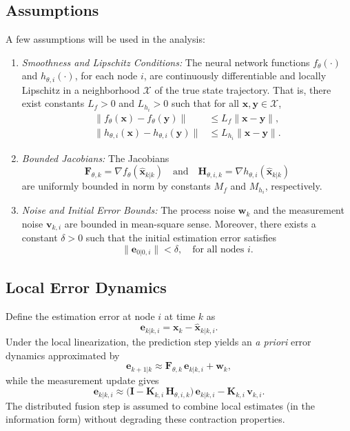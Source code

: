 \documentclass[letterpaper, 10 pt, conference]{ieeeconf}
\begin{document}
\subsection{Assumptions}
A few assumptions will be used in the analysis:
\begin{enumerate}
    \renewcommand{\labelenumi}{\roman{enumi}.}
    \item \textit{Smoothness and Lipschitz Conditions:} The neural network functions $f_\theta(\cdot)$ and $h_{\theta,i}(\cdot)$, for each node $i$, are continuously differentiable and locally Lipschitz in a neighborhood $\mathcal{X}$ of the true state trajectory. That is, there exist constants $L_f > 0$ and $L_{h_i} > 0$ such that for all $\mathbf{x},\mathbf{y}\in\mathcal{X}$,
    \begin{align}
        \| f_\theta(\mathbf{x}) - f_\theta(\mathbf{y}) \| &\leq L_f \|\mathbf{x}-\mathbf{y}\|, \\
        \| h_{\theta,i}(\mathbf{x}) - h_{\theta,i}(\mathbf{y}) \| &\leq L_{h_i} \|\mathbf{x}-\mathbf{y}\|.
    \end{align}
    
    \item \textit{Bounded Jacobians:} The Jacobians
    \[
    \mathbf{F}_{\theta,k} = \nabla f_\theta(\hat{\mathbf{x}}_{k|k}) \quad \text{and} \quad \mathbf{H}_{\theta,i,k} = \nabla h_{\theta,i}(\hat{\mathbf{x}}_{k|k})
    \]
    are uniformly bounded in norm by constants $M_f$ and $M_{h_i}$, respectively.
    
    \item \textit{Noise and Initial Error Bounds:} The process noise $\mathbf{w}_k$ and the measurement noise $\mathbf{v}_{k,i}$ are bounded in mean-square sense. Moreover, there exists a constant $\delta>0$ such that the initial estimation error satisfies
    \[
    \| \mathbf{e}_{0|0,i} \| < \delta, \quad \text{for all nodes } i.
    \]
\end{enumerate}

\subsection{Local Error Dynamics}
Define the estimation error at node $i$ at time $k$ as
\[
\mathbf{e}_{k|k,i} = \mathbf{x}_k - \hat{\mathbf{x}}_{k|k,i}.
\]
Under the local linearization, the prediction step yields an \emph{a priori} error dynamics approximated by
\[
\mathbf{e}_{k+1|k} \approx \mathbf{F}_{\theta,k}\,\mathbf{e}_{k|k,i} + \mathbf{w}_k,
\]
while the measurement update gives
\[
\mathbf{e}_{k|k,i} \approx \bigl(\mathbf{I} - \mathbf{K}_{k,i}\,\mathbf{H}_{\theta,i,k}\bigr)\,\mathbf{e}_{k|k,i} - \mathbf{K}_{k,i}\,\mathbf{v}_{k,i}.
\]
The distributed fusion step is assumed to combine local estimates (in the information form) without degrading these contraction properties.
\end{document}
